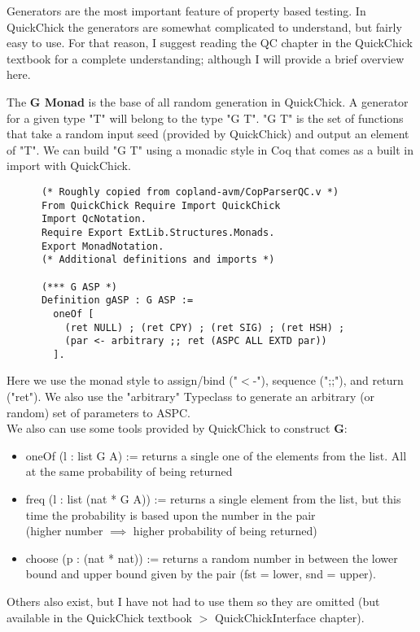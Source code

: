 \documentclass{article}
\begin{document}
    Generators are the most important feature of property based testing. In QuickChick the generators are somewhat complicated to understand, but fairly easy to use. For that reason, I suggest reading the QC chapter in the QuickChick textbook for a complete understanding; although I will provide a brief overview here.

    The \textbf{G Monad} is the base of all random generation in QuickChick. A generator for a given type "T" will belong to the type "G T". "G T" is the set of functions that take a random input seed (provided by QuickChick) and output an element of "T". We can build "G T" using a monadic style in Coq that comes as a built in import with QuickChick.
    \begin{verbatim}
      (* Roughly copied from copland-avm/CopParserQC.v *)
      From QuickChick Require Import QuickChick
      Import QcNotation. 
      Require Export ExtLib.Structures.Monads.
      Export MonadNotation.
      (* Additional definitions and imports *)

      (*** G ASP *)
      Definition gASP : G ASP :=
        oneOf [
          (ret NULL) ; (ret CPY) ; (ret SIG) ; (ret HSH) ;
          (par <- arbitrary ;; ret (ASPC ALL EXTD par))
        ].
    \end{verbatim}
    Here we use the monad style to assign/bind ("$<$-"), sequence (";;"), and return ("ret").
    We also use the "arbitrary" Typeclass to generate an arbitrary (or random) set of parameters to ASPC. \\
    We also can use some tools provided by QuickChick to construct \textbf{G}:
    \begin{itemize}
      \item oneOf (l : list G A) := returns a single one of the elements from the list. All at the same probability of being returned
      \item freq (l : list (nat * G A)) := returns a single element from the list, but this time the probability is based upon the number in the pair \\
      (higher number $\implies$ higher probability of being returned)
      \item choose (p : (nat * nat)) := returns a random number in between the lower bound and upper bound given by the pair (fst = lower, snd = upper).
    \end{itemize}
    Others also exist, but I have not had to use them so they are omitted (but available in the QuickChick textbook $>$ QuickChickInterface chapter).
\end{document}

